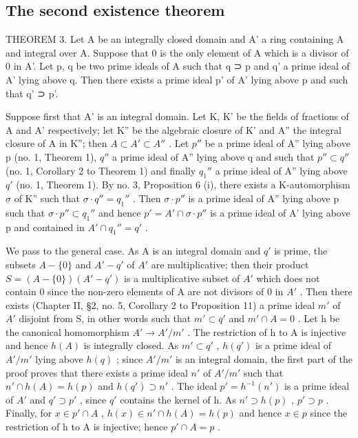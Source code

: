 \subsection{The second existence theorem}

THEOREM 3. Let A be an integrally closed domain and A' a ring containing A and integral over A. Suppose that 0 is the only element of A which is a divisor of 0 in A'. Let p, q be two prime ideals of A such that q ⊃ p and q' a prime ideal of A' lying above q. Then there exists a prime ideal p' of A' lying above p and such that q' ⊃ p'.

Suppose first that A' is an integral domain. Let K, K' be the fields of fractions of A and A' respectively; let K'' be the algebraic closure of K' and A'' the integral closure of A in K''; then \(A \subset A' \subset A''\) . Let \(p''\) be a prime ideal of A'' lying above p (no. 1, Theorem 1), \(q''\) a prime ideal of A'' lying above q and such that \(p'' \subset q''\) (no. 1, Corollary 2 to Theorem 1) and finally \(q_{1}''\) a prime ideal of A'' lying above \(q'\) (no. 1, Theorem 1). By no. 3, Proposition 6 (i), there exists a K-automorphism \(\sigma\) of K'' such that \(\sigma \cdot q'' = q_{1}''\) . Then \(\sigma \cdot p''\) is a prime ideal of A'' lying above p such that \(\sigma \cdot p'' \subset q_{1}''\) and hence \(p' = A' \cap \sigma \cdot p''\) is a prime ideal of A' lying above p and contained in \(A' \cap q_{1}'' = q'\) .

We pass to the general case. As A is an integral domain and \(q'\) is prime, the subsets \(A - \{0\}\) and \(A' - q'\) of \(A'\) are multiplicative; then their product \(S = (A - \{0\})(A' - q')\) is a multiplicative subset of \(A'\) which does not contain 0 since the non-zero elements of A are not divisors of 0 in \(A'\) . Then there exists (Chapter II, §2, no. 5, Corollary 2 to Proposition 11) a prime ideal \(m'\) of \(A'\) disjoint from S, in other words such that \(m' \subset q'\) and \(m' \cap A = 0\) . Let h be the canonical homomorphism \(A' \to A'/m'\) . The restriction of h to A is injective and hence \(h(A)\) is integrally closed. As \(m' \subset q'\) , \(h(q')\) is a prime ideal of \(A'/m'\) lying above \(h(q)\) ; since \(A'/m'\) is an integral domain, the first part of the proof proves that there exists a prime ideal \(n'\) of \(A'/m'\) such that \(n' \cap h(A) = h(p)\) and \(h(q') \supset n'\) . The ideal \(p' = h^{-1}(n')\) is a prime ideal of \(A'\) and \(q' \supset p'\) , since \(q'\) contains the kernel of h. As \(n' \supset h(p)\) , \(p' \supset p\) . Finally, for \(x \in p' \cap A\) , \(h(x) \in n' \cap h(A) = h(p)\) and hence \(x \in p\) since the restriction of h to A is injective; hence \(p' \cap A = p\) .

